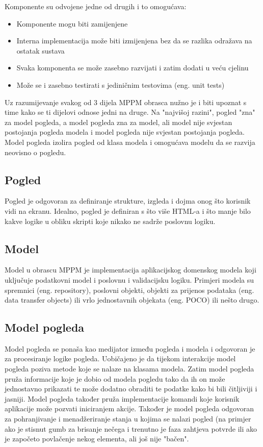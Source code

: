 \documentclass[times, utf8, zavrsni]{fer}
\begin{document}
Komponente su odvojene jedne od drugih i to omogućava:
\begin{itemize}
\item Komponente mogu biti zamijenjene
\item Interna implementacija može biti izmijenjena bez da se razlika odražava na ostatak sustava
\item Svaka komponenta se može zasebno razvijati i zatim dodati u veću cjelinu 
\item Može se i zasebno testirati s jediničnim testovima (eng. unit tests)
\end{itemize}

Uz razumijevanje svakog od 3 dijela MPPM obrasca nužno je i biti upoznat s time kako se ti dijelovi odnose jedni na druge. Na "najvišoj razini", pogled "zna" za model pogleda, a model pogleda zna za model, ali model nije svjestan postojanja pogleda modela i model pogleda nije svjestan postojanja pogleda. Model pogleda izolira pogled od klasa modela i omogućava modelu da se razvija neovisno o pogledu.

\subsection{Pogled}
Pogled je odgovoran za definiranje strukture, izgleda i dojma onog što korisnik vidi na ekranu. Idealno, pogled je definiran s što više HTML-a i što manje bilo kakve logike u obliku skripti koje nikako ne sadrže poslovnu logiku.

\subsection{Model}
Model u obrascu MPPM je implementacija aplikacijskog domenskog modela koji uključuje podatkovni model i poslovnu i validacijsku logiku. Primjeri modela su spremnici (eng. repository), poslovni objekti, objekti za prijenos podataka (eng. data transfer objects) ili vrlo jednostavnih objekata (eng. POCO) ili nešto drugo.

\subsection{Model pogleda}
Model pogleda se ponaša kao medijator između pogleda i modela i odgovoran je za procesiranje logike pogleda. Uobičajeno je da tijekom interakcije model pogleda poziva metode koje se nalaze na klasama modela. Zatim model pogleda pruža informacije koje je dobio od modela pogledu tako da ih on može jednostavno prikazati te može dodatno obraditi te podatke kako bi bili čitljiviji i jasniji. 
Model pogleda također pruža implementacije komandi koje korisnik aplikacije može pozvati iniciranjem akcije. Također je model pogleda odgovoran za pohranjivanje i menadžeriranje stanja u kojima se nalazi pogled (na primjer ako je stisnut gumb za brisanje nečega i trenutno je faza zahtjeva potvrde ili ako je započeto povlačenje nekog elementa, ali još nije "bačen".
\end{document}
